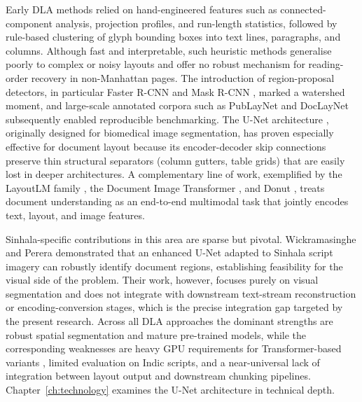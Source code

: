 \documentclass[12pt,a4paper,oneside]{report}
\begin{document}
Early DLA methods relied on hand-engineered features such as connected-component analysis, projection profiles, and run-length statistics, followed by rule-based clustering of glyph bounding boxes into text lines, paragraphs, and columns. Although fast and interpretable, such heuristic methods generalise poorly to complex or noisy layouts and offer no robust mechanism for reading-order recovery in non-Manhattan pages. The introduction of region-proposal detectors, in particular Faster R-CNN \cite{ren2015fasterrcnn} and Mask R-CNN \cite{he2017maskrcnn}, marked a watershed moment, and large-scale annotated corpora such as PubLayNet \cite{zhong2019publaynet} and DocLayNet \cite{pfitzmann2022doclaynet} subsequently enabled reproducible benchmarking. The U-Net architecture \cite{ronneberger2015unet}, originally designed for biomedical image segmentation, has proven especially effective for document layout because its encoder-decoder skip connections preserve thin structural separators (column gutters, table grids) that are easily lost in deeper architectures. A complementary line of work, exemplified by the LayoutLM family \cite{xu2020layoutlm, xu2021layoutlmv2, huang2022layoutlmv3}, the Document Image Transformer \cite{li2022dit}, and Donut \cite{kim2022donut}, treats document understanding as an end-to-end multimodal task that jointly encodes text, layout, and image features.

Sinhala-specific contributions in this area are sparse but pivotal. Wickramasinghe and Perera \cite{wickramasinghe2024unet} demonstrated that an enhanced U-Net adapted to Sinhala script imagery can robustly identify document regions, establishing feasibility for the visual side of the problem. Their work, however, focuses purely on visual segmentation and does not integrate with downstream text-stream reconstruction or encoding-conversion stages, which is the precise integration gap targeted by the present research. Across all DLA approaches the dominant strengths are robust spatial segmentation and mature pre-trained models, while the corresponding weaknesses are heavy GPU requirements for Transformer-based variants \cite{huang2022layoutlmv3, kim2022donut}, limited evaluation on Indic scripts, and a near-universal lack of integration between layout output and downstream chunking pipelines. Chapter~\ref{ch:technology} examines the U-Net architecture in technical depth.
\end{document}
